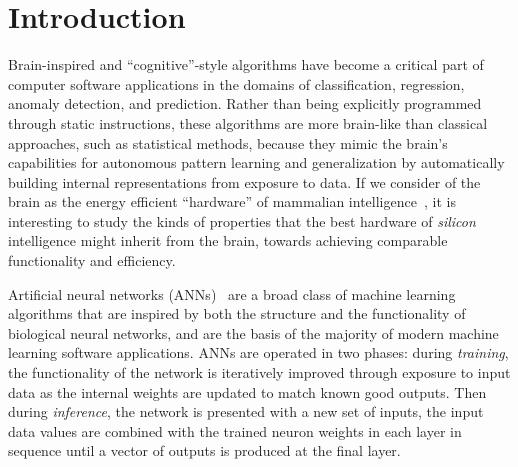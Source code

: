 \section{Introduction}

Brain-inspired and ``cognitive''-style algorithms have become a critical part of computer software applications in the domains of classification, regression, anomaly detection, and prediction.
Rather than being explicitly programmed through static instructions, these algorithms are more brain-like than classical approaches, such as statistical methods, because they mimic the brain's capabilities for autonomous pattern learning and generalization by automatically building internal representations from exposure to data.
If we consider of the brain as the energy efficient ``hardware'' of mammalian intelligence~\cite{laughlin2003communication}, it is interesting to study the kinds of properties that the best hardware of \textit{silicon} intelligence might inherit from the brain, towards achieving comparable functionality and efficiency.

Artificial neural networks (ANNs)~\cite{mcculloch1943logical, hebb2005organization, farley1954simulation, rochester1956tests} are a broad class of machine learning algorithms that are inspired by both the structure and the functionality of biological neural networks, and are the basis of the majority of modern machine learning software applications.
ANNs are operated in two phases: during \textit{training}, the functionality of the network is iteratively improved through exposure to input data as the internal weights are updated to match known good outputs.
Then during \textit{inference}, the network is presented with a new set of inputs, the input data values are combined with the trained neuron weights in each layer in sequence until a vector of outputs is produced at the final layer.


